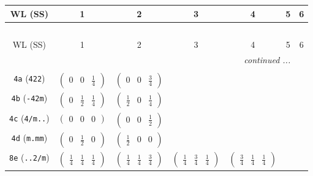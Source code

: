 \documentclass[fleqn,9pt,landscape]{jsarticle}
\begin{document}
\begin{center}
\renewcommand{\arraystretch}{1.2}
\begin{longtable}{ccccccc}
 \hline \hline
WL (SS) & 1 & 2 & 3 & 4 & 5 & 6 \\ \hline \endfirsthead

\multicolumn{6}{l}{\tablename\ \thetable{}} \\
 \hline \hline
WL (SS) & 1 & 2 & 3 & 4 & 5 & 6 \\ \hline \endhead

 \hline \hline
\multicolumn{6}{r}{\footnotesize\it continued ...} \\ \endfoot

 \hline \hline
\multicolumn{6}{r}{} \\ \endlastfoot

{\tt 4a} ({\tt 422}) & $ \begin{pmatrix} 0 & 0 & \frac{1}{4} \end{pmatrix} $ & $ \begin{pmatrix} 0 & 0 & \frac{3}{4} \end{pmatrix} $ & $  $ & $  $ & $  $ & $  $ \\ \hline
{\tt 4b} ({\tt -42m}) & $ \begin{pmatrix} 0 & \frac{1}{2} & \frac{1}{4} \end{pmatrix} $ & $ \begin{pmatrix} \frac{1}{2} & 0 & \frac{1}{4} \end{pmatrix} $ & $  $ & $  $ & $  $ & $  $ \\ \hline
{\tt 4c} ({\tt 4/m..}) & $ \begin{pmatrix} 0 & 0 & 0 \end{pmatrix} $ & $ \begin{pmatrix} 0 & 0 & \frac{1}{2} \end{pmatrix} $ & $  $ & $  $ & $  $ & $  $ \\ \hline
{\tt 4d} ({\tt m.mm}) & $ \begin{pmatrix} 0 & \frac{1}{2} & 0 \end{pmatrix} $ & $ \begin{pmatrix} \frac{1}{2} & 0 & 0 \end{pmatrix} $ & $  $ & $  $ & $  $ & $  $ \\ \hline
{\tt 8e} ({\tt ..2/m}) & $ \begin{pmatrix} \frac{1}{4} & \frac{1}{4} & \frac{1}{4} \end{pmatrix} $ & $ \begin{pmatrix} \frac{1}{4} & \frac{1}{4} & \frac{3}{4} \end{pmatrix} $ & $ \begin{pmatrix} \frac{1}{4} & \frac{3}{4} & \frac{1}{4} \end{pmatrix} $ & $ \begin{pmatrix} \frac{3}{4} & \frac{1}{4} & \frac{1}{4} \end{pmatrix} $ & $  $ & $  $ \\ \hline

\end{longtable}
\end{center}
\end{document}
